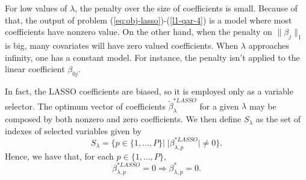 
For low values of $\lambda$, the penalty over the size of coefficients is small. Because of that, the output of problem (\ref{eq:obj-lasso})-(\ref{l1-qar-4}) is a model where most coefficients have nonzero value. On the other hand, when the penalty on $\| \beta_j \|_1$ is big, many covariates will have zero valued coefficients. When $\lambda$ approaches infinity, one has a constant model. 
For instance, the penalty isn't applied to the linear coefficient $\beta_{0j}$. 

In fact, the LASSO coefficients are biased, so it is employed only as a variable selector. 
The optimum vector of coefficients $\tilde \beta_\lambda^{*LASSO}$ for a given $\lambda$ may be composed by both nonzero and zero coefficients. 
We then define $S_\lambda$ as the set of indexes of selected variables given by
\begin{equation*}
S_\lambda = \{ p \in \{ 1,\dots,P \} | \; |\beta^{*LASSO}_{\lambda,p}| \neq 0  \}.
\end{equation*}
Hence, we have that, for each $p \in \{ 1,\dots,P \}$,
$$\beta^{*LASSO}_{\lambda,p} = 0 \Longrightarrow \beta^{*}_{\lambda,p} = 0.$$

